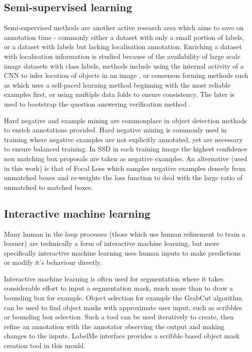 \subsection{Semi-supervised learning}

Semi-supervised methods are another active research area which aims to save on annotation time - commonly either a dataset with only a small portion of labels, or a dataset with labels but lacking localisation annotation. Enriching a dataset with localisation information is studied because of the availability of large scale image datasets with class labels, methods include using the internal activity of a \gls{CNN} to infer location of objects in an image \cite{Sivic2015}, or consensus forming methods such as \cite{Sangineto} which uses a self-paced learning method beginning with the most reliable examples first, or \cite{Cinbis2017} using multiple data folds to ensure consistency. The later is used to bootstrap the question answering verification method \cite{Papadopoulos2016}.

Hard negative and example mining are commonplace in object detection methods to enrich annotations provided. Hard negative mining is commonly used in training where negative examples are not explicitly annotated, yet are necessary to ensure balanced training. In \gls{SSD} \cite{Liu2016a} in each training image the highest confidence non matching  box proposals are taken as negative examples. An alternative (used in this work) is that of Focal Loss \cite{Lin2017} which samples negative examples densely from unmatched boxes and re-weights the loss function to deal with the large ratio of unmatched to matched boxes.


\subsection{Interactive machine learning}

Many human in the loop processes (those which use human refinement to train a learner) are technically a form of interactive machine learning, but more specifically interactive machine learning uses human inputs to make predictions or modify it's behaviour directly.

Interactive machine learning is often used for segmentation where it takes considerable effort to input a segmentation mask, much more than to draw a bounding box for example. Object selection for example the GrabCut algorithm \cite{Rother} can be used to find object masks with approximate user input, such as scribbles or bounding box selection. Such a tool can be used iteratively to create, then refine an annotation with the annotator observing the output and making changes to the inputs.  LabelMe \cite{Russell2007} interface provides a scribble based object mask creation tool in this mould. 

